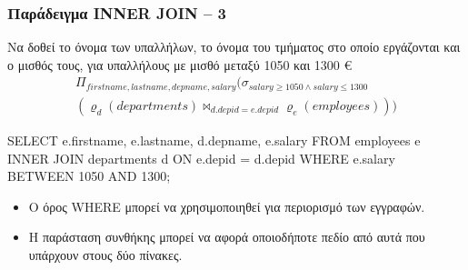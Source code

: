 \begin{frame}
\frametitle{Παράδειγμα  {\en INNER JOIN} -- 3}
\begin{minipage}{\wE}
\vspace*{-0.5cm}
\begin{exampleblock}{\small Να δοθεί το όνομα των υπαλλήλων, το όνομα του τμήματος στο
              οποίο εργάζονται και ο μισθός τους, για υπαλλήλους με μισθό
              μεταξύ 1050 και 1300 \euro}
\en
\[
\begin{array}{l}
  \Pi_{firstname, lastname, depname, salary}
  (\sigma_{salary\geq1050 \wedge salary\leq1300} \\
  ( \varrho_{d} (departments) \bowtie_{d.depid=e.depid} \varrho_{e} (employees) ) )
\end{array}
\]
\pause
\vspace*{-0.5cm}
\en
\begin{SQL}
  SELECT e.firstname, e.lastname, d.depname, e.salary
    FROM employees e INNER JOIN departments d
         ON e.depid = d.depid
   WHERE e.salary BETWEEN 1050 AND 1300;
\end{SQL}
\end{exampleblock}
\el
\begin{itemize}
  \item Ο όρος {\sq WHERE} μπορεί να χρησιμοποιηθεί  για περιορισμό  των εγγραφών.
  \item Η παράσταση συνθήκης μπορεί να αφορά οποιοδήποτε   πεδίο
        από αυτά που υπάρχουν στους δύο πίνακες.
\end{itemize}
\end{minipage}
\end{frame}



